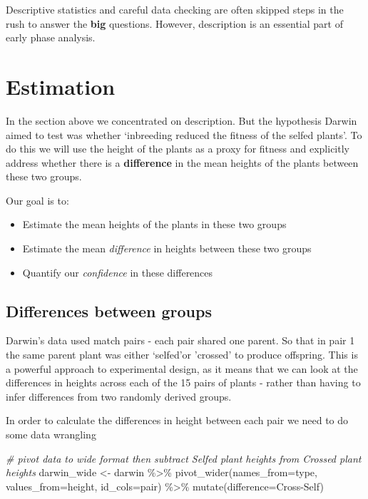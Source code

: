 \documentclass[
]{book}
\newenvironment{Shaded}{\begin{snugshade}}{\end{snugshade}}
\newcommand{\AttributeTok}[1]{\textcolor[rgb]{0.77,0.63,0.00}{#1}}
\newcommand{\CommentTok}[1]{\textcolor[rgb]{0.56,0.35,0.01}{\textit{#1}}}
\newcommand{\FunctionTok}[1]{\textcolor[rgb]{0.00,0.00,0.00}{#1}}
\newcommand{\NormalTok}[1]{#1}
\newcommand{\OtherTok}[1]{\textcolor[rgb]{0.56,0.35,0.01}{#1}}
\newcommand{\SpecialCharTok}[1]{\textcolor[rgb]{0.00,0.00,0.00}{#1}}
\begin{document}
Descriptive statistics and careful data checking are often skipped steps in the rush to answer the \textbf{big} questions. However, description is an essential part of early phase analysis.

\hypertarget{estimation}{%
\section{Estimation}\label{estimation}}

In the section above we concentrated on description. But the hypothesis Darwin aimed to test was whether `inbreeding reduced the fitness of the selfed plants'. To do this we will use the height of the plants as a proxy for fitness and explicitly address whether there is a \textbf{difference} in the mean heights of the plants between these two groups.

Our goal is to:

\begin{itemize}
\item
  Estimate the mean heights of the plants in these two groups
\item
  Estimate the mean \emph{difference} in heights between these two groups
\item
  Quantify our \emph{confidence} in these differences
\end{itemize}

\hypertarget{differences-between-groups}{%
\subsection{Differences between groups}\label{differences-between-groups}}

Darwin's data used match pairs - each pair shared one parent. So that in pair 1 the same parent plant was either `selfed'or 'crossed' to produce offspring. This is a powerful approach to experimental design, as it means that we can look at the differences in heights across each of the 15 pairs of plants - rather than having to infer differences from two randomly derived groups.

In order to calculate the differences in height between each pair we need to do some data wrangling

\begin{Shaded}
\begin{Highlighting}[]
\CommentTok{\# pivot data to wide format then subtract Selfed plant heights from Crossed plant heights}
\NormalTok{darwin\_wide }\OtherTok{\textless{}{-}}\NormalTok{ darwin }\SpecialCharTok{\%\textgreater{}\%} 
  \FunctionTok{pivot\_wider}\NormalTok{(}\AttributeTok{names\_from=}\NormalTok{type, }\AttributeTok{values\_from=}\NormalTok{height, }\AttributeTok{id\_cols=}\NormalTok{pair) }\SpecialCharTok{\%\textgreater{}\%} 
  \FunctionTok{mutate}\NormalTok{(}\AttributeTok{difference=}\NormalTok{Cross}\SpecialCharTok{{-}}\NormalTok{Self)}
\end{Highlighting}
\end{Shaded}
\end{document}
